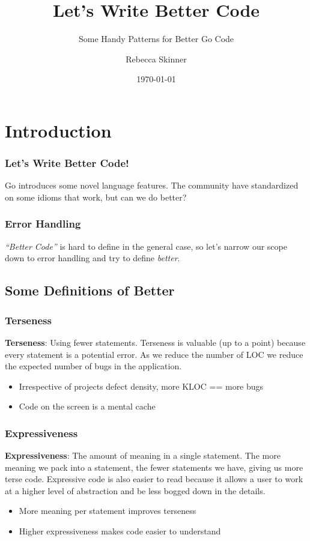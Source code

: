 \documentclass{beamer}
\title{Let's Write Better Code}
\subtitle{Some Handy Patterns for Better Go Code}
\author{Rebecca Skinner}
\institute{Asteris, LLC}
\date{\today}
\begin{document}
\begin{frame}
  \titlepage{}
\end{frame}

\section{Introduction}
\begin{frame}
  \frametitle{Let's Write Better Code!}
  Go introduces some novel language features.  The community have
  standardized on some idioms that work, but can we do better?
\end{frame}

\begin{frame}
  \frametitle{Error Handling}
  {\it ``Better Code''} is hard to define in the general case, so let's
  narrow our scope down to error handling and try to define
  {\it better}.
\end{frame}

\subsection{Some Definitions of Better}
\begin{frame}
  \frametitle{Terseness}
  {\bf Terseness}: Using fewer statements.
  \vfill
  Terseness is valuable (up to a point) because every statement is a
  potential error.  As we reduce the number of LOC we reduce the
  expected number of bugs in the application.
  \vfill
  \begin{itemize}
  \item Irrespective of projects defect density, more KLOC == more bugs
  \item Code on the screen is a mental cache
  \end{itemize}
\end{frame}

\begin{frame}
  \frametitle{Expressiveness}
  {\bf Expressiveness}: The amount of meaning in a single statement.
  \vfill
  The more meaning we pack into a statement, the fewer statements we
  have, giving us more terse code.  Expressive code is also easier to
  read because it allows a user to work at a higher level of
  abstraction and be less bogged down in the details.
  \vfill
  \begin{itemize}
    \item More meaning per statement improves terseness
    \item Higher expressiveness makes code easier to understand
  \end{itemize}
\end{frame}
\end{document}

